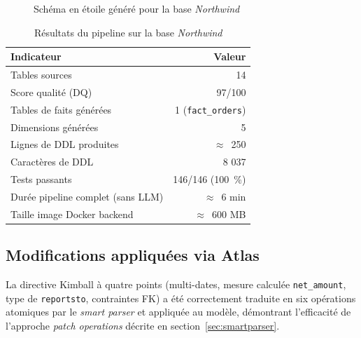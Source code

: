 \documentclass[12pt, a4paper]{report}
\begin{document}
\begin{figure}[H]
\caption{Schéma en étoile généré pour la base \emph{Northwind}}
\label{fig:star}
\end{figure}

\begin{table}[H]
\centering
\caption{Résultats du pipeline sur la base \emph{Northwind}}
\label{tab:results}
\begin{tabular}{lr}
\toprule
\textbf{Indicateur} & \textbf{Valeur} \\
\midrule
Tables sources                          & 14 \\
Score qualité (DQ)                      & 97/100 \\
Tables de faits générées                & 1 (\texttt{fact\_orders}) \\
Dimensions générées                     & 5 \\
Lignes de DDL produites                 & $\approx$\ 250 \\
Caractères de DDL                       & 8 037 \\
Tests passants                          & 146/146 (100~\%) \\
Durée pipeline complet (sans LLM)       & $\approx$\ 6 min \\
Taille image Docker backend             & $\approx$\ 600 MB \\
\bottomrule
\end{tabular}
\end{table}

\subsection{Modifications appliquées via Atlas}
La directive Kimball à quatre points (multi-dates, mesure calculée
\texttt{net\_amount}, type de \texttt{reportsto}, contraintes \ac{FK})
a été correctement traduite en six opérations atomiques par le
\emph{smart parser} et appliquée au modèle, démontrant l'efficacité
de l'approche \emph{patch operations} décrite en
section~\ref{sec:smartparser}.
\end{document}
